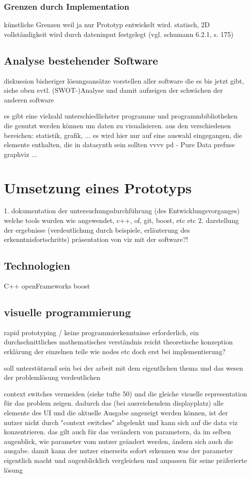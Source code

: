 \documentclass[a4paper, 12pt, onepage, pdftex, headsepline, footsepline]{scrreprt}
\begin{document}
\subsection{Grenzen durch Implementation}
künstliche Grenzen weil ja nur Prototyp entwickelt wird.
statisch, 2D vollständigkeit wird durch dateninput festgelegt (vgl. schumann 6.2.1, s. 175)

\section{Analyse bestehender Software}
diskussion bisheriger lösungsansätze
vorstellen aller software die es bis jetzt gibt, siehe oben
evtl. (SWOT-)Analyse und damit aufzeigen der schwächen der anderen software

es gibt eine vielzahl unterschiedlichster programme und programmbibliotheken die genutzt werden können um daten zu visualisieren.
aus den verschiedenen bereichen: statistik, grafik, ...
es wird hier nur auf eine auswahl eingegangen, die elemente enthalten, die in datasynth sein sollten
vvvv
pd - Pure Data
prefuse
graphviz
...
\chapter{Umsetzung eines Prototyps}
1. dokumentation der untersuchungsdurchführung (des Entwicklungsvorganges)
welche tools wurden wie angewendet, c++, of, git, boost, etc etc
2. darstellung der ergebnisse (verdeutlichung durch beispiele, erläuterung des erkenntnisfortschritts)
präsentation von viz mit der software?!
\section{Technologien}
C++
openFrameworks
boost
\section{visuelle programmierung}
rapid prototyping / keine programmierkenntnisse erforderlich, ein durchschnittliches mathematisches verständnis reicht
theoretische konzeption
erklärung der einzelnen teile wie nodes etc doch erst bei implementierung?

soll unterstützend sein bei der arbeit mit dem eigentlichen thema und das wesen der problemlösung verdeutlichen

context switches vermeiden (siehe tufte 50) und die gleiche visuelle representation für das problem zeigen.
dadurch das (bei ausreichendem displayplatz) alle elemente des UI und die aktuelle Ausgabe angezeigt werden können, ist der nutzer nicht durch "context switches" abgelenkt und kann sich auf die data viz konzentrieren.
das gilt auch für das verändern von parametern, da im selben augenblick, wie parameter vom nutzer geändert werden, ändern sich auch die ausgabe.
damit kann der nutzer einerseits sofort erkennen was der parameter eigentlich macht und augenblicklich vergleichen und anpassen für seine präferierte lösung
\end{document}
